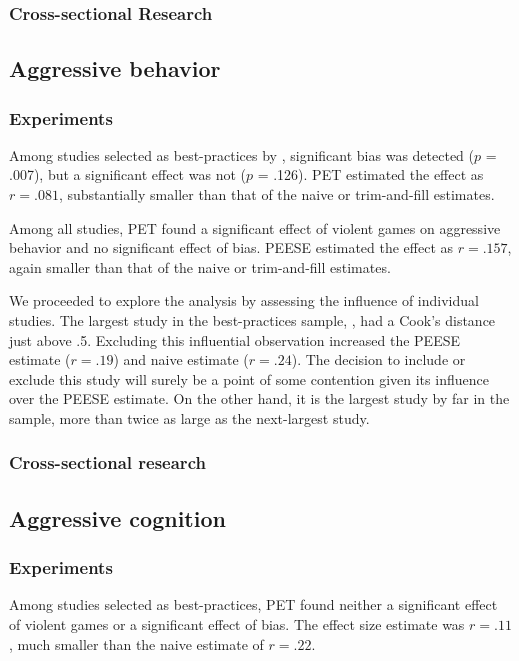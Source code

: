 \documentclass[man]{apa6}
\begin{document}
\subsubsection{Cross-sectional Research}

\subsection{Aggressive behavior}
\subsubsection{Experiments}
Among studies selected as best-practices by \citet{Anderson:etal:2010}, significant bias was detected ($p$ = .007), but a significant effect was not ($p$ = .126). PET estimated the effect as $r = .081$, substantially smaller than that of the naive or trim-and-fill estimates.

Among all studies, PET found a significant effect of violent games on aggressive behavior and no significant effect of bias. PEESE estimated the effect as $r = .157$, again smaller than that of the naive or trim-and-fill estimates. 

We proceeded to explore the analysis by assessing the influence of individual studies. The largest study in the best-practices sample, \citet[Study 1]{Anderson:etal:2007}, had a Cook's distance just above .5. Excluding this influential observation increased the PEESE estimate ($r=.19$) and naive estimate ($r = .24$). The decision to include or exclude this study will surely be a point of some contention given its influence over the PEESE estimate. On the other hand, it is the largest study by far in the sample, more than twice as large as the next-largest study. 

\subsubsection{Cross-sectional research}

\subsection{Aggressive cognition}
\subsubsection{Experiments}
Among studies selected as best-practices, PET found neither a significant effect of violent games or a significant effect of bias. The effect size estimate was $r = .11$, much smaller than the naive estimate of $r = .22$.
\end{document}
